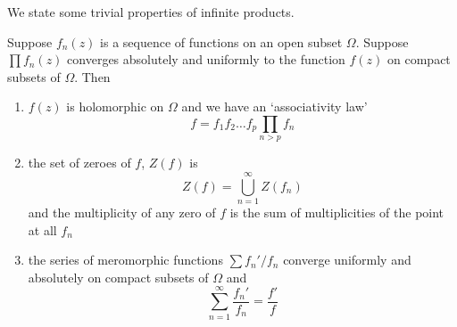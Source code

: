We state some trivial properties of infinite products.
\begin{theorem}
    Suppose $f_n(z)$ is a sequence of functions on an open subset $\Omega$. Suppose $\prod f_n(z)$ converges absolutely and uniformly to the function $f(z)$ on compact subsets of $\Omega$. Then
    \begin{enumerate}
        \item $f(z)$ is holomorphic on $\Omega$ and we have an `associativity law'
        $$f = f_1 f_2 \dots f_p \prod_{n > p} f_n$$
        \item the set of zeroes of $f$, $Z(f)$ is
        $$Z(f) = \bigcup_{n = 1}^\infty Z(f_n)$$
        and the multiplicity of any zero of $f$ is the sum of multiplicities of the point at all $f_n$
        \item the series of meromorphic functions $\sum f_n'/f_n$ converge uniformly and absolutely on compact subsets of $\Omega$ and
        $$\sum_{n = 1}^\infty \frac{f_n'}{f_n} = \frac{f'}{f}$$
    \end{enumerate}
\end{theorem}
